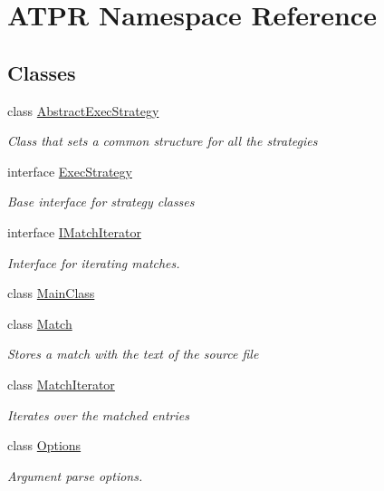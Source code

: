 \hypertarget{namespace_a_t_p_r}{}\section{A\+T\+PR Namespace Reference}
\label{namespace_a_t_p_r}
\subsection*{Classes}
\begin{DoxyCompactItemize}
\item 
class \hyperlink{class_a_t_p_r_1_1_abstract_exec_strategy}{Abstract\+Exec\+Strategy}
\begin{DoxyCompactList}\small\item\em Class that sets a common structure for all the strategies \end{DoxyCompactList}\item 
interface \hyperlink{interface_a_t_p_r_1_1_exec_strategy}{Exec\+Strategy}
\begin{DoxyCompactList}\small\item\em Base interface for strategy classes \end{DoxyCompactList}\item 
interface \hyperlink{interface_a_t_p_r_1_1_i_match_iterator}{I\+Match\+Iterator}
\begin{DoxyCompactList}\small\item\em Interface for iterating matches. \end{DoxyCompactList}\item 
class \hyperlink{class_a_t_p_r_1_1_main_class}{Main\+Class}
\item 
class \hyperlink{class_a_t_p_r_1_1_match}{Match}
\begin{DoxyCompactList}\small\item\em Stores a match with the text of the source file \end{DoxyCompactList}\item 
class \hyperlink{class_a_t_p_r_1_1_match_iterator}{Match\+Iterator}
\begin{DoxyCompactList}\small\item\em Iterates over the matched entries \end{DoxyCompactList}\item 
class \hyperlink{class_a_t_p_r_1_1_options}{Options}
\begin{DoxyCompactList}\small\item\em Argument parse options. \end{DoxyCompactList}\end{DoxyCompactItemize}
